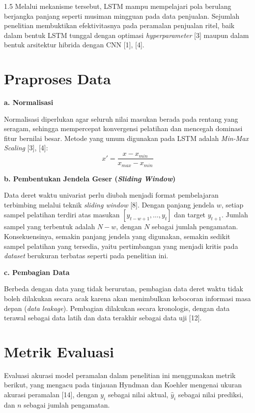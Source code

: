 \documentclass[12pt, a4paper, onecolumn, oneside]{report}
\begin{document}
\begin{spacing}{1.5}
Melalui mekanisme tersebut, LSTM mampu mempelajari pola berulang berjangka panjang seperti musiman mingguan pada data penjualan. Sejumlah penelitian membuktikan efektivitasnya pada peramalan penjualan ritel, baik dalam bentuk LSTM tunggal dengan optimasi \textit{hyperparameter} [3] maupun dalam bentuk arsitektur hibrida dengan CNN [1], [4].

\section{Praproses Data}

\noindent\textbf{a. Normalisasi}

Normalisasi diperlukan agar seluruh nilai masukan berada pada rentang yang seragam, sehingga mempercepat konvergensi pelatihan dan mencegah dominasi fitur bernilai besar. Metode yang umum digunakan pada LSTM adalah \textit{Min-Max Scaling} [3], [4]:
\begin{equation}
    x' = \frac{x - x_{min}}{x_{max} - x_{min}}
\end{equation}

\noindent\textbf{b. Pembentukan Jendela Geser (\textit{Sliding Window})}

Data deret waktu univariat perlu diubah menjadi format pembelajaran terbimbing melalui teknik \textit{sliding window} [8]. Dengan panjang jendela $w$, setiap sampel pelatihan terdiri atas masukan $[y_{t-w+1}, \dots, y_t]$ dan target $y_{t+1}$. Jumlah sampel yang terbentuk adalah $N - w$, dengan $N$ sebagai jumlah pengamatan. Konsekuensinya, semakin panjang jendela yang digunakan, semakin sedikit sampel pelatihan yang tersedia, yaitu pertimbangan yang menjadi kritis pada \textit{dataset} berukuran terbatas seperti pada penelitian ini.

\noindent\textbf{c. Pembagian Data}

Berbeda dengan data yang tidak berurutan, pembagian data deret waktu tidak boleh dilakukan secara acak karena akan menimbulkan kebocoran informasi masa depan (\textit{data leakage}). Pembagian dilakukan secara kronologis, dengan data terawal sebagai data latih dan data terakhir sebagai data uji [12].

\section{Metrik Evaluasi}

Evaluasi akurasi model peramalan dalam penelitian ini menggunakan metrik berikut, yang mengacu pada tinjauan Hyndman dan Koehler mengenai ukuran akurasi peramalan [14], dengan $y_i$ sebagai nilai aktual, $\hat{y}_i$ sebagai nilai prediksi, dan $n$ sebagai jumlah pengamatan.


\end{spacing}
\end{document}
